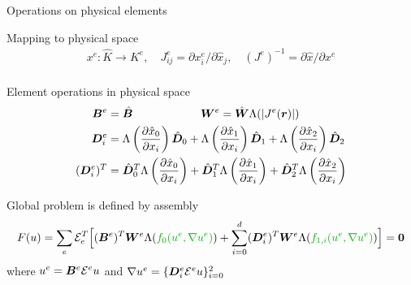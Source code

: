 \begin{frame}{Operations on physical elements}
  \begin{block}{Mapping to physical space}
    \vspace{-2em}
    \begin{gather*}
      x^e : \hat K \to K^e,\quad J^e_{ij} = \partial x_i^e/\partial \hat x_j, \quad (J^e)^{-1} = \partial \hat x/\partial x^e \\
    \end{gather*}
  \vspace{-2em}
  \end{block}
  \vspace{-2em}
  \begin{block}{Element operations in physical space}
  \vspace{-2em}
    \begin{align*}
      \bm B^e &= \hat{\bm B} \qquad \qquad \qquad \bm W^e = \hat{\bm W} \Lambda(\left\lvert J^e(\bm r) \right\rvert) \\
      \bm D^e_i &= \Lambda\left(\frac{\partial \hat x_0}{\partial x_i}\right) \hat{\bm D}_0
      + \Lambda\left(\frac{\partial \hat x_1}{\partial x_i}\right) \hat{\bm D}_1
      + \Lambda\left(\frac{\partial \hat x_2}{\partial x_i}\right) \hat{\bm D}_2 \\
      (\bm D^e_i)^T &= \hat{\bm D}_0^T \Lambda\left(\frac{\partial \hat x_0}{\partial x_i}\right)
      + \hat{\bm D}_1^T \Lambda\left(\frac{\partial \hat x_1}{\partial x_i}\right)
      + \hat{\bm D}_2^T \Lambda\left(\frac{\partial \hat x_2}{\partial x_i}\right)
    \end{align*}
  \end{block}
  \vspace{-2em}
  \begin{block}{Global problem is defined by assembly}
  \vspace{-2em}
  \begin{equation*}
    F(u) =
    \sum_e \EE_e^T \Big[ (\bm B^e)^T \bm W^e \Lambda({\color{green!70!black} f_0(u^e,\nabla u^e)})
    + \sum_{i=0}^d(\bm D_i^e)^T \bm W^e \Lambda({\color{green!70!black} f_{1,i}(u^e,\nabla u^e)}) \Big] = \bm 0
  \end{equation*}
  where $u^e = \bm B^e \mathcal{E}^e u$ and $\nabla u^e = \{\bm D_i^e \mathcal{E}^e u\}_{i=0}^2$
  \end{block}
\end{frame}
